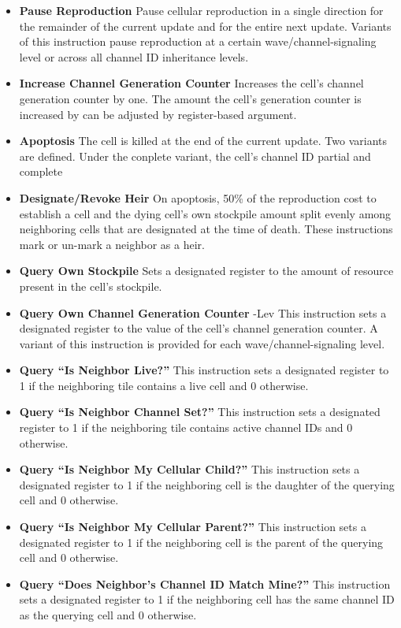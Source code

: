 \begin{itemize}
\item \textbf{Pause Reproduction}
Pause cellular reproduction in a single direction for the remainder of the current update and for the entire next update.
Variants of this instruction pause reproduction at a certain wave/channel-signaling level or across all channel ID inheritance levels.
\item \textbf{Increase Channel Generation Counter}
Increases the cell's channel generation counter by one.
The amount the cell's generation counter is increased by can be adjusted by register-based argument.
\item \textbf{Apoptosis}
The cell is killed at the end of the current update.
Two variants are defined.
Under the conplete variant, the cell's channel ID partial and complete
\item \textbf{Designate/Revoke Heir} On apoptosis, 50\% of the reproduction cost to establish a cell and the dying cell's own stockpile amount split evenly among neighboring cells that are designated at the time of death.
These instructions mark or un-mark a neighbor as a heir.
\item \textbf{Query Own Stockpile}
Sets a designated register to the amount of resource present in the cell's stockpile.
\item \textbf{Query Own Channel Generation Counter} -Lev
This instruction sets a designated register to the value of the cell's channel generation counter.
A variant of this instruction is provided for each wave/channel-signaling level.
\item \textbf{Query ``Is Neighbor Live?''}
This instruction sets a designated register to 1 if the neighboring tile contains a live cell and 0 otherwise.
\item \textbf{Query ``Is Neighbor Channel Set?''}
This instruction sets a designated register to 1 if the neighboring tile contains active channel IDs and 0 otherwise.
\item \textbf{Query ``Is Neighbor My Cellular Child?''}
This instruction sets a designated register to 1 if the neighboring cell is the daughter of the querying cell and 0 otherwise.
\item \textbf{Query ``Is Neighbor My Cellular Parent?''}
This instruction sets a designated register to 1 if the neighboring cell is the parent of the querying cell and 0 otherwise.
\item \textbf{Query ``Does Neighbor's Channel ID Match Mine?''}
This instruction sets a designated register to 1 if the neighboring cell has the same channel ID as the querying cell and 0 otherwise.

\end{itemize}
